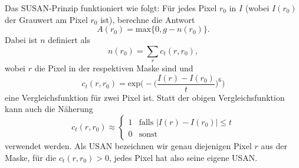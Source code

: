 \documentclass[a4paper, 11pt]{report}
\theoremstyle{definition}
\begin{document}
		Das SUSAN-Prinzip funktioniert wie folgt:
		Für jedes Pixel $r_0$ in $I$ (wobei $I(r_0)$ der Grauwert am Pixel $r_0$ ist), berechne die Antwort
			$$A(r_0) = \text{max}\{0, g - n(r_0)\}.$$
		Dabei ist $n$ definiert als
			$$n(r_0) = \sum_r c_t(r, r_0),$$
		wobei $r$ die Pixel in der respektiven Maske sind und	
			$$
				c_t(r, r_0) =
					\text{exp}\bigg(-\Big(\frac{I(r) - I(r_0)}{t}\Big)^6\bigg)
			$$
		eine Vergleichsfunktion für zwei Pixel ist. Statt der obigen Vergleichsfunktion kann auch die Näherung
			$$
				c_t(r, r_0) \approx
					\begin{cases}
						1 	& \text{falls } |I(r) - I(r_0)| \leq t 	\\
						0 	& \text{sonst}
					\end{cases}
			$$
		verwendet werden. Als USAN bezeichnen wir genau diejenigen Pixel $r$ aus der Maske, für die $c_t(r, r_0) > 0$, jedes Pixel hat also seine eigene USAN.
\end{document}
